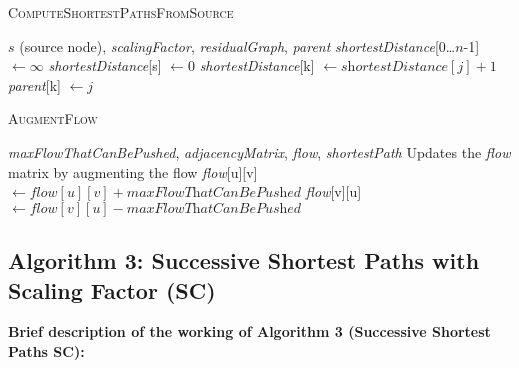 \documentclass{article}
\begin{document}
\begin{algorithm}[H]
\caption{\textcolor{keywordcolor}{\textsc{ComputeShortestPathsFromSource}}}
\begin{algorithmic}[1]
\State {} $s$ (source node), \textit{scalingFactor}, \textit{residualGraph}, \textit{parent}
\State {} \textit{shortestDistance}[0…$n$-1] $\gets \infty$
\State \textit{shortestDistance}[s] $\gets 0$
                        \State \textit{shortestDistance}[k] $\gets \textit{shortestDistance}[j] + 1$
                        \State \textit{parent}[k] $\gets j$
                    \EndIf
                \EndIf
            \EndIf
        \EndFor
    \EndFor
\EndFor
\end{algorithmic}
\end{algorithm}

\begin{algorithm}[H]
\caption{\textcolor{keywordcolor}{\textsc{AugmentFlow}}}
\begin{algorithmic}[1]
\State {} \textit{maxFlowThatCanBePushed}, \textit{adjacencyMatrix}, \textit{flow}, \textit{shortestPath}
\State {} Updates the \textit{flow} matrix by augmenting the flow
        \State \textit{flow}[u][v] $\gets \textit{flow}[u][v] + \textit{maxFlowThatCanBePushed}$
        \State \textit{flow}[v][u] $\gets \textit{flow}[v][u] - \textit{maxFlowThatCanBePushed}$
    \EndIf
\EndFor
\end{algorithmic}
\end{algorithm}

\newpage

\subsection{Algorithm 3: Successive Shortest Paths with Scaling Factor (SC)}

\textbf{Brief description of the working of Algorithm 3 (Successive Shortest Paths SC):}
\end{document}
